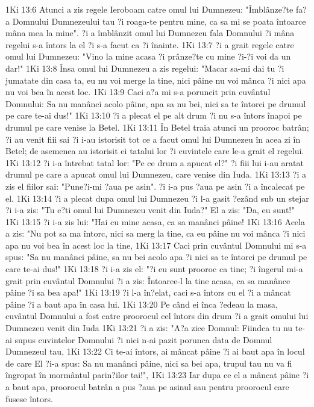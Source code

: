 1Ki 13:6  Atunci a zis regele Ieroboam catre omul lui Dumnezeu: "Îmblânze?te fa?a Domnului Dumnezeului tau ?i roaga-te pentru mine, ca sa mi se poata întoarce mâna mea la mine". ?i a îmblânzit omul lui Dumnezeu fala Domnului ?i mâna regelui s-a întors la el ?i s-a facut ca ?i înainte.
1Ki 13:7  ?i a grait regele catre omul lui Dumnezeu: "Vino la mine acasa ?i prânze?te cu mine ?i-?i voi da un dar!"
1Ki 13:8  Însa omul lui Dumnezeu a zis regelui: "Macar sa-mi dai tu ?i jumatate din casa ta, eu nu voi merge la tine, nici pâine nu voi mânca ?i nici apa nu voi bea în acest loc.
1Ki 13:9  Caci a?a mi s-a poruncit prin cuvântul Domnului: Sa nu manânci acolo pâine, apa sa nu bei, nici sa te întorci pe drumul pe care te-ai dus!"
1Ki 13:10  ?i a plecat el pe alt drum ?i nu s-a întors înapoi pe drumul pe care venise la Betel.
1Ki 13:11  În Betel traia atunci un prooroc batrân; ?i au venit fiii sai ?i i-au istorisit tot ce a facut omul lui Dumnezeu în acea zi în Betel; de asemenea au istorisit ei tatalui lor ?i cuvintele care le-a grait el regelui.
1Ki 13:12  ?i i-a întrebat tatal lor: "Pe ce drum a apucat el?" ?i fiii lui i-au aratat drumul pe care a apucat omul lui Dumnezeu, care venise din Iuda.
1Ki 13:13  ?i a zis el fiilor sai: "Pune?i-mi ?aua pe asin". ?i i-a pus ?aua pe asin ?i a încalecat pe el.
1Ki 13:14  ?i a plecat dupa omul lui Dumnezeu ?i l-a gasit ?ezând sub un stejar ?i i-a zis: "Tu e?ti omul lui Dumnezeu venit din Iuda?" El a zis: "Da, eu sunt!"
1Ki 13:15  ?i i-a zis lui: "Hai cu mine acasa, ca sa manânci pâine!
1Ki 13:16  Acela a zis: "Nu pot sa ma întorc, nici sa merg la tine, ca eu pâine nu voi mânca ?i nici apa nu voi bea în acest loc la tine,
1Ki 13:17  Caci prin cuvântul Domnului mi s-a spus: "Sa nu manânci pâine, sa nu bei acolo apa ?i nici sa te întorci pe drumul pe care te-ai dus!"
1Ki 13:18  ?i i-a zis el: "?i eu sunt prooroc ca tine; ?i îngerul mi-a grait prin cuvântul Domnului ?i a zis: Întoarce-l la tine acasa, ca sa manânce pâine ?i sa bea apa!"
1Ki 13:19  ?i l-a în?elat, caci s-a întors cu el ?i a mâncat pâine ?i a baut apa în casa lui.
1Ki 13:20  Pe când ei înca ?edeau la masa, cuvântul Domnului a fost catre proorocul cel întors din drum ?i a grait omului lui Dumnezeu venit din Iuda
1Ki 13:21  ?i a zis: "A?a zice Domnul: Fiindca tu nu te-ai supus cuvintelor Domnului ?i nici n-ai pazit porunca data de Domnul Dumnezeul tau,
1Ki 13:22  Ci te-ai întors, ai mâncat pâine ?i ai baut apa în locul de care El ?i-a spus: Sa nu manânci pâine, nici sa bei apa, trupul tau nu va fi îngropat în mormântul parin?ilor tai!",
1Ki 13:23  Iar dupa ce el a mâncat pâine ?i a baut apa, proorocul batrân a pus ?aua pe asinul sau pentru proorocul care fusese întors.
